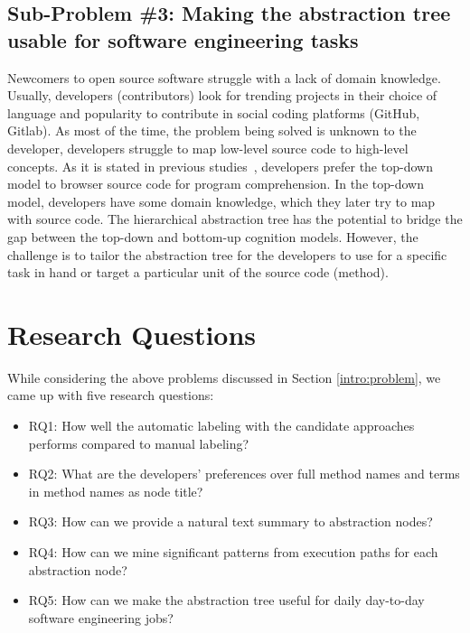    
    \subsection{Sub-Problem \#3: Making the abstraction tree usable for software engineering tasks} 
    
    Newcomers to open source software struggle with a lack of domain knowledge. Usually, developers (contributors) look for trending projects in their choice of language and popularity to contribute in social coding platforms (GitHub, Gitlab). As most of the time, the problem being solved is unknown to the developer, developers struggle to map low-level source code to high-level concepts. As it is stated in previous studies~\cite{brooks1983theoryComprehensionPrograms}, developers prefer the top-down model to browser source code for program comprehension. In the top-down model, developers have some domain knowledge, which they later try to map with source code. The hierarchical abstraction tree has the potential to bridge the gap between the top-down and bottom-up cognition models. However, the challenge is to tailor the abstraction tree for the developers to use for a specific task in hand or target a particular unit of the source code (method). 
    
    
\section{Research Questions}   
\label{intro:research_questions}
While considering the above problems discussed in Section \ref{intro:problem}, we came up with five research questions:
\begin{itemize}
    \item RQ1: How well the automatic labeling with the candidate approaches performs compared to manual labeling?
    \item RQ2: What are the developers' preferences over full method names and terms in method names as node title?
    \item RQ3: How can we provide a natural text summary to abstraction nodes?
    \item RQ4: How can we mine significant patterns from execution paths for each abstraction node?
    \item RQ5: How can we make the abstraction tree useful for daily day-to-day software engineering jobs?
    
\end{itemize}

